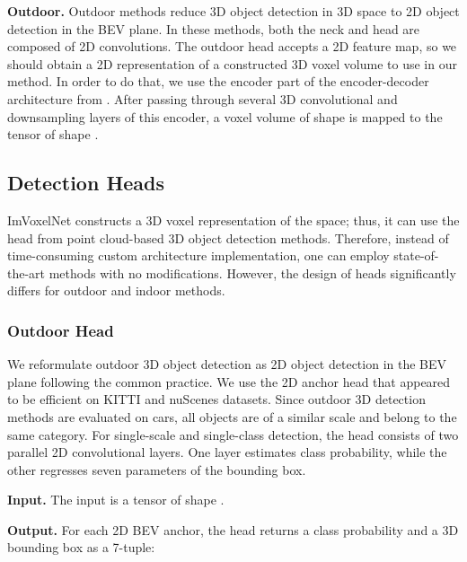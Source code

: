 \documentclass[10pt,twocolumn,letterpaper]{article}
\begin{document}
\textbf{Outdoor.} Outdoor methods \cite{sindagi2019mvxnet, lang2019pointpillars, yan2018second} reduce 3D object detection in 3D space to 2D object detection in the BEV plane. In these methods, both the neck and head are composed of 2D convolutions. The outdoor head accepts a 2D feature map, so we should obtain a 2D representation of a constructed 3D voxel volume to use in our method. In order to do that, we use the encoder part of the encoder-decoder architecture from \cite{murez2020atlas}. After passing through several 3D convolutional and downsampling layers of this encoder, a voxel volume  of shape  is mapped to the tensor of shape .

\subsection{Detection Heads}

ImVoxelNet constructs a 3D voxel representation of the space; thus, it can use the head from point cloud-based 3D object detection methods. Therefore, instead of time-consuming custom architecture implementation, one can employ state-of-the-art methods with no modifications. However, the design of heads significantly differs for outdoor \cite{lang2019pointpillars, yan2018second} and indoor \cite{qi2019votenet, qi2020imvotenet} methods.

\subsubsection{Outdoor Head} \label{sec:outdoor}

We reformulate outdoor 3D object detection as 2D object detection in the BEV plane following the common practice. We use the 2D anchor head that appeared to be efficient \cite{lang2019pointpillars, yan2018second} on KITTI \cite{geiger2012kitti} and nuScenes \cite{caesar2020nuscenes} datasets. Since outdoor 3D detection methods are evaluated on cars, all objects are of a similar scale and belong to the same category. For single-scale and single-class detection, the head consists of two parallel 2D convolutional layers. One layer estimates class probability, while the other regresses seven parameters of the bounding box.

\textbf{Input.} The input is a tensor of shape .

\textbf{Output.} For each 2D BEV anchor, the head returns a class probability  and a 3D bounding box as a 7-tuple:
\end{document}
